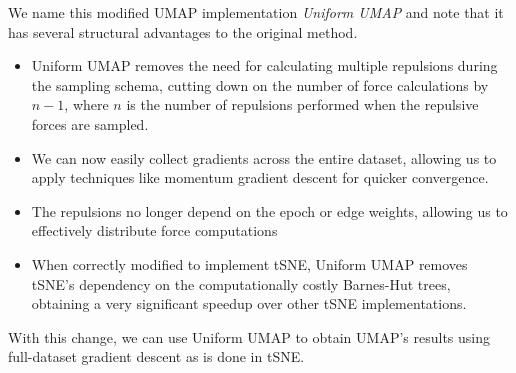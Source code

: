 \documentclass{article}
\theoremstyle{definition}
\begin{document}
We name this modified UMAP implementation \textit{Uniform UMAP} and note that it has several structural advantages to the original method. 
\begin{itemize}
        \item Uniform UMAP removes the need for calculating multiple repulsions during the sampling schema, cutting down on the number of force calculations by $n-1$, where $n$ is the number of repulsions performed when the repulsive forces are sampled.
        \item We can now easily collect gradients across the entire dataset, allowing us to apply techniques like momentum gradient descent for quicker convergence.
        \item The repulsions no longer depend on the epoch or edge weights, allowing us to effectively distribute force computations
        \item When correctly modified to implement tSNE, Uniform UMAP removes tSNE's dependency on the computationally costly Barnes-Hut trees, obtaining a very
            significant speedup over other tSNE implementations.
\end{itemize}

With this change, we can use Uniform UMAP to obtain UMAP's results using full-dataset gradient descent as is done in tSNE.

\end{document}
